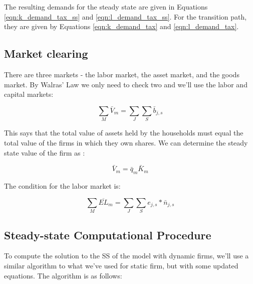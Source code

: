 \documentclass[letterpaper,12pt]{article}
\theoremstyle{definition}
\begin{document}
\begin{spacing}{1.5}
The resulting demands for the steady state are given in Equations \ref{eqn:k_demand_tax_ss} and \ref{eqn:l_demand_tax_ss}.  For the transition path, they are given by Equations  \ref{eqn:k_demand_tax} and \ref{eqn:l_demand_tax}.


\subsection*{Market clearing}

There are three markets - the labor market, the asset market, and the goods market.  By Walras' Law we only need to check two and we'll use the labor and capital markets:

\begin{equation}
\sum_{M} \bar{V}_{m} = \sum_{J}\sum_{S}\bar{b}_{j,s}
\end{equation}

\noindent\noindent This says that the total value of assets held by the households must equal the total value of the firms in which they own shares. We can determine the steady state value of the firm as :

\begin{equation}
\label{eqn:solve_firm_value_tax_ss}
\bar{V}_{m} =\bar{q}_{m}\bar{K}_{m}
\end{equation}

The condition for the labor market is: 

\begin{equation}
\sum_{M} \overline{EL}_{m} = \sum_{J}\sum_{S}e_{j,s}*\bar{n}_{j,s}
\end{equation}

\subsection*{Steady-state Computational Procedure}

To compute the solution to the SS of the model with dynamic firms, we'll use a similar algorithm to what we've used for static firm, but with some updated equations.  The algorithm is as follows:


\end{spacing}
\end{document}

